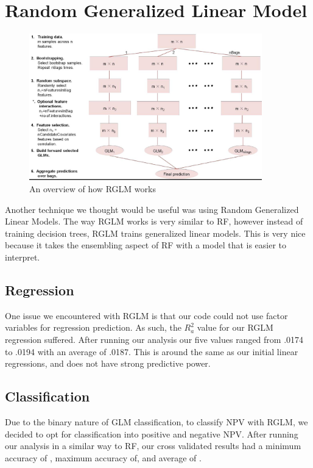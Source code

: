 \documentclass[12 pt]{uncw_thesis}
\theoremstyle{plain}
\theoremstyle{remark}
\theoremstyle{definition}
\begin{document}
\section{Random Generalized Linear Model}
\begin{figure}
	\includegraphics[width=0.9\textwidth]{images/RGLM.jpg}
	\caption{An overview of how RGLM works \cite{RGLM}}
	\label{fig:RGLM}
\end{figure}
Another technique we thought would be useful was using Random Generalized Linear Models. The way RGLM works is very similar to RF, however instead of training decision trees, RGLM trains generalized linear models. This is very nice because it takes the ensembling aspect of RF with a model that is easier to interpret.
\subsection{Regression}
One issue we encountered with RGLM is that our code could not use factor variables for regression prediction. As such, the \(R_a^2\) value for our RGLM regression suffered. After running our analysis our five values ranged from .0174 to .0194 with an average of .0187. This is around the same as our initial linear regressions, and does not have strong predictive power.
\subsection{Classification}
Due to the binary nature of GLM classification, to classify NPV with RGLM, we decided to opt for classification into positive and negative NPV. After running our analysis in a similar way to RF, our cross validated results had a minimum accuracy of , maximum accuracy of, and average of . 


\newpage
\end{document}
